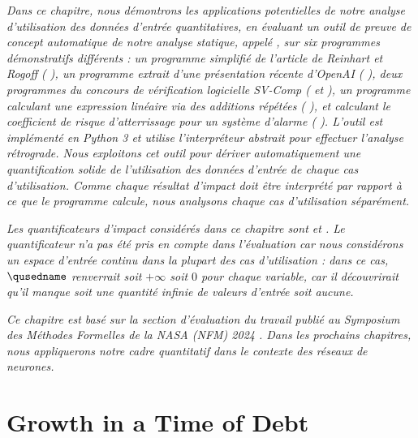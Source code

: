 \emph{Dans ce chapitre, nous démontrons les applications potentielles de notre analyse d'utilisation des données d'entrée quantitatives, en évaluant un outil de preuve de concept automatique de notre analyse statique, appelé \impatto\sidenotemark[\label{impatto}], sur six programmes démonstratifs différents :
un programme simplifié de l'article de Reinhart et Rogoff (\cf{} ),
un programme extrait d'une présentation récente d'OpenAI (\cf{} ),
deux programmes du concours de vérification logicielle SV-Comp (\cf{}  et ),
un programme calculant une expression linéaire via des additions répétées (\cf{} ),
et  calculant le coefficient de risque d'atterrissage pour un système d'alarme (\cf{} ).
L'outil \impatto{} est implémenté en Python 3 et utilise l'interpréteur abstrait \interproc\sidenotemark[\label{interproc}] pour effectuer l'analyse rétrograde.
Nous exploitons cet outil pour dériver automatiquement une quantification solide de l'utilisation des données d'entrée de chaque cas d'utilisation.
Comme chaque résultat d'impact doit être interprété par rapport à ce que le programme calcule, nous analysons chaque cas d'utilisation séparément.
}

\emph{
Les quantificateurs d'impact considérés dans ce chapitre sont \outcomesname{} et \rangename{}.
Le quantificateur \qusedname{} n'a pas été pris en compte dans l'évaluation car nous considérons un espace d'entrée continu dans la plupart des cas d'utilisation : dans ce cas, $\qusedname$ renverrait soit $+\infty$ soit $0$ pour chaque variable, car il découvrirait qu'il manque soit une quantité infinie de valeurs d'entrée soit aucune.
}

\emph{
Ce chapitre est basé sur la section d'évaluation du travail publié au Symposium des Méthodes Formelles de la NASA (NFM) 2024 . Dans les prochains chapitres, nous appliquerons notre cadre quantitatif dans le contexte des réseaux de neurones.}


\section{Growth in a Time of Debt}


